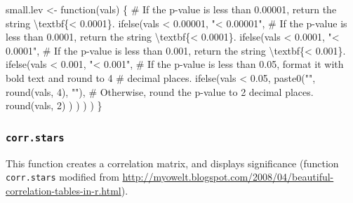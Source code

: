 \documentclass[
  bookmarksnumbered]{article}
\newenvironment{Shaded}{\begin{snugshade}}{\end{snugshade}}
\newcommand{\CommentTok}[1]{\textcolor[rgb]{0.50,0.62,0.50}{#1}}
\newcommand{\ControlFlowTok}[1]{\textcolor[rgb]{0.94,0.87,0.69}{#1}}
\newcommand{\DecValTok}[1]{\textcolor[rgb]{0.86,0.86,0.80}{#1}}
\newcommand{\FloatTok}[1]{\textcolor[rgb]{0.75,0.75,0.82}{#1}}
\newcommand{\FunctionTok}[1]{\textcolor[rgb]{0.94,0.94,0.56}{#1}}
\newcommand{\NormalTok}[1]{\textcolor[rgb]{0.80,0.80,0.80}{#1}}
\newcommand{\OtherTok}[1]{\textcolor[rgb]{0.94,0.94,0.56}{#1}}
\newcommand{\SpecialCharTok}[1]{\textcolor[rgb]{0.86,0.64,0.64}{#1}}
\newcommand{\StringTok}[1]{\textcolor[rgb]{0.80,0.58,0.58}{#1}}
\begin{document}
\begin{Shaded}
\begin{Highlighting}[]
\NormalTok{small.lev }\OtherTok{\textless{}{-}} \ControlFlowTok{function}\NormalTok{(vals) \{}
  \CommentTok{\# If the p{-}value is less than 0.00001, return the string \textquotesingle{}\textbackslash{}textbf\{\textless{} 0.0001\}\textquotesingle{}.}
  \FunctionTok{ifelse}\NormalTok{(vals }\SpecialCharTok{\textless{}} \FloatTok{0.00001}\NormalTok{,}
  \StringTok{"\textless{} 0.00001"}\NormalTok{,}
    \CommentTok{\# If the p{-}value is less than 0.0001, return the string \textquotesingle{}\textbackslash{}textbf\{\textless{} 0.0001\}\textquotesingle{}.}
    \FunctionTok{ifelse}\NormalTok{(vals }\SpecialCharTok{\textless{}} \FloatTok{0.0001}\NormalTok{,}
      \StringTok{"\textless{} 0.0001"}\NormalTok{,}
      \CommentTok{\# If the p{-}value is less than 0.001, return the string \textquotesingle{}\textbackslash{}textbf\{\textless{} 0.001\}\textquotesingle{}.}
      \FunctionTok{ifelse}\NormalTok{(vals }\SpecialCharTok{\textless{}} \FloatTok{0.001}\NormalTok{,}
        \StringTok{"\textless{} 0.001"}\NormalTok{,}
        \CommentTok{\# If the p{-}value is less than 0.05, format it with bold text and round to 4}
        \CommentTok{\# decimal places.}
        \FunctionTok{ifelse}\NormalTok{(vals }\SpecialCharTok{\textless{}} \FloatTok{0.05}\NormalTok{,}
          \FunctionTok{paste0}\NormalTok{(}\StringTok{""}\NormalTok{, }\FunctionTok{round}\NormalTok{(vals, }\DecValTok{4}\NormalTok{), }\StringTok{""}\NormalTok{),}
          \CommentTok{\# Otherwise, round the p{-}value to 2 decimal places.}
          \FunctionTok{round}\NormalTok{(vals, }\DecValTok{2}\NormalTok{)}
\NormalTok{        )}
\NormalTok{      )}
\NormalTok{    )}
\NormalTok{  )}
\NormalTok{\}}
\end{Highlighting}
\end{Shaded}

\subsubsection{\texorpdfstring{\texttt{corr.stars}}{corr.stars}}\label{corr.stars}

This function creates a correlation matrix, and displays significance (function \texttt{corr.stars} modified from \url{http://myowelt.blogspot.com/2008/04/beautiful-correlation-tables-in-r.html}).
\end{document}
